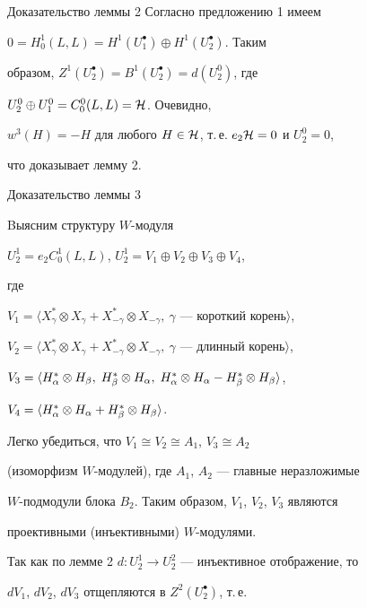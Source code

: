 


\begin{pf*}{Доказательство леммы 2} Согласно предложению 1 имеем


$0=H^1_0(L,L)=H^1(U^{\bullet}_1)\oplus H^1(U^{\bullet}_2)$. Таким 


образом, $Z^1(U^{\bullet}_2)=B^1(U^{\bullet}_2)=d(U^0_2)$, где 


$U^0_2\oplus U^0_1=C^0_0(L,L)={\cal H}$. Очевидно, 


$w^3(H)=-H$ для любого $H\in {\cal H}$, т.\,е. $e_2{\cal H} =0$ и $U^0_2=0$, 


что доказывает лемму 2. 


\end{pf*} 


 


\begin{pf*}{Доказательство леммы 3} 


Bыясним структуру $W$-модуля 


$U_2^1=e_2 C^1_0(L,L)$, $U_2^1=V_1\oplus V_2\oplus V_3\oplus V_4$, 


где 


$V_1=\langle X_{\gamma}^*\otimes X_{\gamma}+X_{-\gamma}^* 


\otimes X_{-\gamma},\ 


\gamma \text{ --- короткий корень}\rangle$, 


$V_2=\langle X_{\gamma}^*\otimes X_{\gamma}+ 


X_{-\gamma}^*\otimes X_{-\gamma},\ 


\gamma \text{ --- длинный корень}\rangle$, 


$V_3=\langle H^*_{\a}\otimes H_{\b},\; H^*_{\b}\otimes H_{\a}, \; 


H^*_{\a}\otimes H_{\a}-H^*_{\b}\otimes H_{\b}\rangle$, 


$V_4=\langle H^*_{\alpha}\otimes H_{\alpha}+H^*_{\beta}\otimes H_{\beta}\rangle$. 


Легко убедиться, что $V_1\cong V_2\cong A_1$, $V_3\cong A_2$ 


(изоморфизм $W$-модулей), где $A_1$, $A_2$ --- главные неразложимые 


$W$-подмодули блока $B_2$. Таким образом, $V_1$, $V_2$, $V_3$ являются 


проективными (инъективными) $W$-модулями. 


Так как по лемме 2\; $d:U^1_2\to U^2_2$ --- инъективное отображение, то 


$dV_1$, $dV_2$, $dV_3$ отщепляются в $Z^2(U^{\bullet}_2)$, т.\,е. 



\end{pf*}
